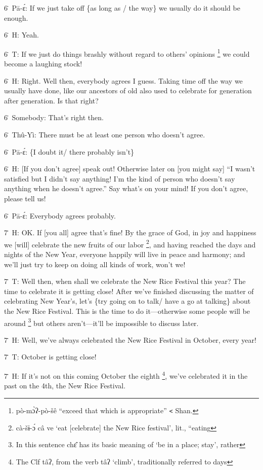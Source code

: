 6\. Pā-ɛ́: If we just take off \{as long as / the way\} we usually do it should
be enough.

6\. H: Yeah.

6\. T: If we just do things brashly without regard to others' opinions \footnote{pò-mɔ̀ʔ-pò-šê ``exceed that which is appropriate'' \texttt{<} Shan.} we
could become a laughing stock!

6\. H: Right.  Well then, everybody agrees I guess.  Taking time off the way we
usually have done, like our ancestors of old also used to celebrate for generation
after generation.  Is that right?

6\. Somebody: That's right then.

6\. Thû-Yì: There must be at least one person who doesn't agree.

6\. Pā-ɛ́: \{I doubt it/ there probably isn't\}

6\. H: [If you don't agree] speak out!  Otherwise later on [you might say] ``I
wasn't satisfied but I didn't say anything! I'm the kind of person who doesn't
say anything when he doesn't agree.'' Say what's on your mind!  If you don't agree,
please tell us!

6\. Pā-ɛ́: Everybody agrees probably.

7\. H: OK. If [you all] agree that's fine!  By the grace of God, in joy and happiness
we [will] celebrate the new fruits of our labor \footnote{cà-šɨ-ɔ́ câ ve `eat [celebrate] the New Rice festival', lit., ``eating}, and having reached the days
and nights of the New Year, everyone happily will live in peace and harmony; and
we'll just try to keep on doing all kinds of work, won't we!

7\. T: Well then, when shall we celebrate the New Rice Festival this year?  The
time to celebrate it is getting close!  After we've finished discussing the matter
of celebrating New Year's, let's \{try going on to talk/ have a go at talking\}
about the New Rice Festival.  This is the time to do it---otherwise some people
will be around \footnote{In this sentence chɛ̂ has its basic meaning of `be in a place; stay', rather} but others aren't---it'll be impossible to discuss later.

7\. H: Well, we've always celebrated the New Rice Festival in October, every year!

7\. T: October is getting close!

7\. H: If it's not on this coming October the eighth \footnote{The Clf tâʔ, from the verb tâʔ `climb', traditionally referred to days}, we've celebrated it
in the past on the 4th, the New Rice Festival.

